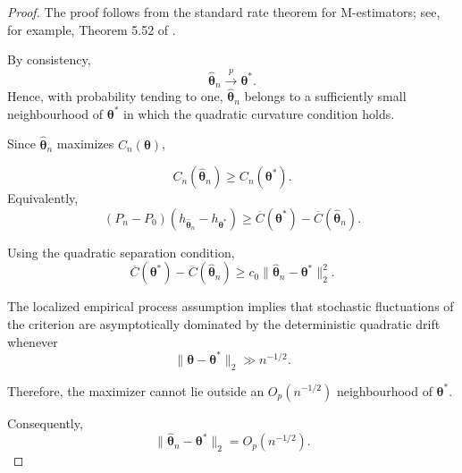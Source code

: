 \documentclass[pdflatex,sn-mathphys-ay]{sn-jnl}%
\let\oldtheta\theta
\renewcommand{\theta}{\boldsymbol{\oldtheta}}
\theoremstyle{thmstyleone}%
\theoremstyle{thmstyletwo}%
\theoremstyle{thmstylethree}%
\begin{document}
\begin{proof}

The proof follows from the standard rate theorem for M-estimators; see, for example, Theorem 5.52 of \citep{vandervaart1998}.

By consistency,
\[
    \widehat{\boldsymbol{\theta}}_n
    \xrightarrow{p}
    \boldsymbol{\theta}^*.
\]
Hence, with probability tending to one, $\widehat{\boldsymbol{\theta}}_n$
belongs to a sufficiently small neighbourhood of $\boldsymbol{\theta}^*$ in which the quadratic curvature condition holds.

Since $ \widehat{\boldsymbol{\theta}}_n$ maximizes $ C_n(\boldsymbol{\theta})$,

\[
    C_n(\widehat{\boldsymbol{\theta}}_n)
    \geq
    C_n(\boldsymbol{\theta}^*).
\]
Equivalently,
\[
    (P_n-P_0)
    \left(
        h_{\widehat{\boldsymbol{\theta}}_n}
        -
        h_{\boldsymbol{\theta}^*}
    \right)
    \geq
    \overline{C}(\boldsymbol{\theta}^*)
    -
    \overline{C}(\widehat{\boldsymbol{\theta}}_n).
\]

Using the quadratic separation condition,
\[
    \overline{C}(\boldsymbol{\theta}^*)
    -
    \overline{C}(\widehat{\boldsymbol{\theta}}_n)
    \geq
    c_0
    \|
        \widehat{\boldsymbol{\theta}}_n
        -
        \boldsymbol{\theta}^*
    \|_2^2.
\]

The localized empirical process assumption implies that stochastic fluctuations of the criterion are asymptotically dominated by the deterministic quadratic drift whenever
\[
    \|
        \boldsymbol{\theta}
        -
        \boldsymbol{\theta}^*
    \|_2
    \gg
    n^{-1/2}.
\]

Therefore, the maximizer cannot lie outside an $ O_p(n^{-1/2})$ neighbourhood of $\boldsymbol{\theta}^*$.


Consequently,
\[
    \|
        \widehat{\boldsymbol{\theta}}_n
        -
        \boldsymbol{\theta}^*
    \|_2
    =
    O_p(n^{-1/2}).
\]

\end{proof}
\end{document}
